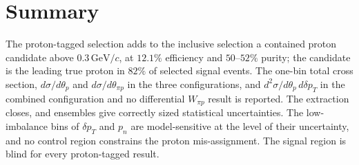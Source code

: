 \documentclass[11pt,a4paper]{article}
\newcommand{\GeVc}{\,\text{GeV}\!/c}
\begin{document}
\section{Summary}
\label{sec:pt_summary}

The proton-tagged selection adds to the inclusive selection a contained proton candidate above
$0.3\GeVc$, at $12.1\%$ efficiency and $50$--$52\%$ purity; the candidate is the leading true proton in
$82\%$ of selected signal events. The one-bin total cross section, $d\sigma/d\theta_p$ and
$d\sigma/d\theta_{\pi p}$ in the three configurations, and $d^2\sigma/d\theta_p\,d\delta p_T$ in the
combined configuration and no differential $W_{\pi p}$ result is reported. The extraction closes, and
ensembles give correctly sized statistical uncertainties. The low-imbalance bins of $\delta p_T$ and $p_n$
are model-sensitive at the level of their uncertainty, and no control region constrains the proton
mis-assignment. The signal region is blind for every proton-tagged result.
\end{document}
